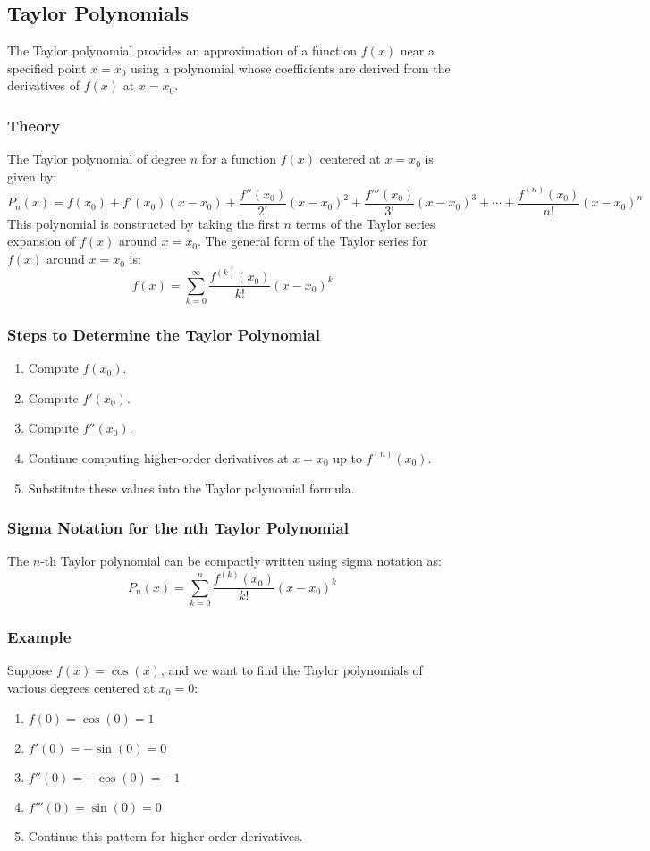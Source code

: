 \documentclass{article}
\begin{document}
\subsection*{Taylor Polynomials}
The Taylor polynomial provides an approximation of a function \( f(x) \) near a specified point \( x = x_0 \) using a polynomial whose coefficients are derived from the derivatives of \( f(x) \) at \( x = x_0 \).

\subsubsection*{Theory}
The Taylor polynomial of degree \( n \) for a function \( f(x) \) centered at \( x = x_0 \) is given by:
\[ P_n(x) = f(x_0) + f'(x_0)(x - x_0) + \frac{f''(x_0)}{2!}(x - x_0)^2 + \frac{f'''(x_0)}{3!}(x - x_0)^3 + \cdots + \frac{f^{(n)}(x_0)}{n!}(x - x_0)^n \]
This polynomial is constructed by taking the first \( n \) terms of the Taylor series expansion of \( f(x) \) around \( x = x_0 \). The general form of the Taylor series for \( f(x) \) around \( x = x_0 \) is:
\[ f(x) = \sum_{k=0}^{\infty} \frac{f^{(k)}(x_0)}{k!} (x - x_0)^k \]

\subsubsection*{Steps to Determine the Taylor Polynomial}
\begin{enumerate}
\item Compute \( f(x_0) \).
\item Compute \( f'(x_0) \).
\item Compute \( f''(x_0) \).
\item Continue computing higher-order derivatives at \( x = x_0 \) up to \( f^{(n)}(x_0) \).
\item Substitute these values into the Taylor polynomial formula.
\end{enumerate}

\subsubsection*{Sigma Notation for the nth Taylor Polynomial}
The \( n \)-th Taylor polynomial can be compactly written using sigma notation as:
\[ P_n(x) = \sum_{k=0}^{n} \frac{f^{(k)}(x_0)}{k!} (x - x_0)^k \]

\subsubsection*{Example}
Suppose \( f(x) = \cos(x) \), and we want to find the Taylor polynomials of various degrees centered at \( x_0 = 0 \):
\begin{enumerate}
\item \( f(0) = \cos(0) = 1 \)
\item \( f'(0) = -\sin(0) = 0 \)
\item \( f''(0) = -\cos(0) = -1 \)
\item \( f'''(0) = \sin(0) = 0 \)
\item Continue this pattern for higher-order derivatives.
\end{enumerate}
\end{document}
